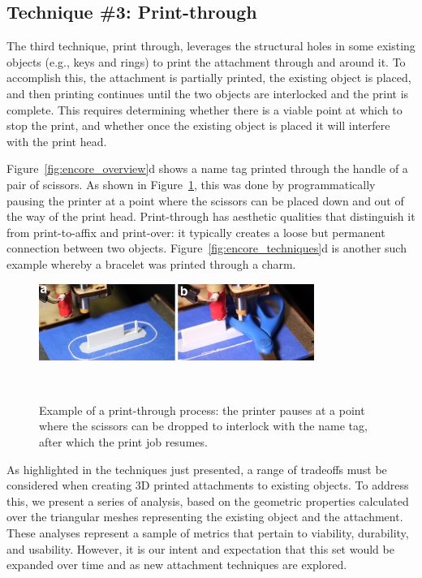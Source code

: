 \subsection{Technique \#3: Print-through}
The third technique, print through, leverages the structural holes in some existing objects (e.g., keys and rings) to print the attachment through and around it. To accomplish this, the attachment is partially printed, the existing object is placed, and then printing continues until the two objects are interlocked and the print is complete. This requires determining whether there is a viable point at which to stop the print, and whether once the existing object is placed it will interfere with the print head.

Figure~\ref{fig:encore_overview}d shows a name tag printed through the handle of a pair of scissors. As shown in Figure~\ref{fig:encore_printthru}, this was done by programmatically pausing the printer at a point where the scissors can be placed down and out of the way of the print head. Print-through has aesthetic qualities that distinguish it from print-to-affix and print-over: it typically creates a loose but permanent connection between two objects. Figure~\ref{fig:encore_techniques}d is another such example whereby a bracelet was printed through a charm.

\begin{figure}[h]
  \centering
  \includegraphics[width=0.8\textwidth]{figures/encore-printthru.pdf}
  \caption{Example of a print-through process: the printer pauses at a point where the scissors can be dropped to interlock with the name tag, after which the print job resumes. }~\label{fig:encore_printthru}
\end{figure}

As highlighted in the techniques just presented, a range of tradeoffs must be considered when creating 3D printed attachments to existing objects. To address this, we present a series of analysis, based on the geometric properties calculated over the triangular meshes representing the existing object and the attachment. These analyses represent a sample of metrics that pertain to viability, durability, and usability. However, it is our intent and expectation that this set would be expanded over time and as new attachment techniques are explored.

